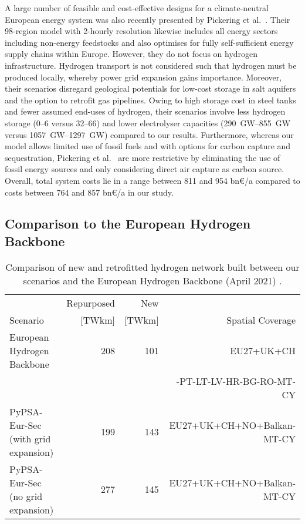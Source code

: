 A large number of feasible and cost-effective designs for a climate-neutral
European energy system was also recently presented by Pickering et
al.~\cite{pickeringDiversityOptions}. Their 98-region model with 2-hourly
resolution likewise includes all energy sectors including non-energy feedstocks
and also optimises for fully self-sufficient energy supply chains within Europe.
However, they do not focus on hydrogen infrastructure. Hydrogen transport is not
considered such that hydrogen must be produced locally, whereby power grid
expansion gains importance. Moreover, their scenarios disregard geological
potentials for low-cost storage in salt aquifers and the option to retrofit gas
pipelines. Owing to high storage cost in steel tanks and fewer assumed end-uses
of hydrogen, their scenarios involve less hydrogen storage (\SIrange{0}{6}{\twh}
versus \SIrange{32}{66}{\twh}) and lower electrolyser capacities
(\SIrange{290}{855}{\giga\watt} versus \SIrange{1057}{1297}{\giga\watt})
compared to our results. Furthermore, whereas our model allows limited use of
fossil fuels and with options for carbon capture and sequestration, Pickering et
al.~\cite{pickeringDiversityOptions} are more restrictive by eliminating the use
of fossil energy sources and only considering direct air capture as carbon
source. Overall, total system costs lie in a range between 811 and 954 bn\euro/a
compared to costs between 764 and 857 bn\euro/a in our study.

\subsection*{Comparison to the European Hydrogen Backbone}

\begin{table}
  \caption{Comparison of new and retrofitted hydrogen network built between our scenarios and the European Hydrogen Backbone (April 2021) \cite{gasforclimateExtendingEuropean2021}.}
  \label{tab:ehb}
  \centering
  \footnotesize
  \begin{tabular}{lrrr}
      \toprule
       & Repurposed & New &  \\
       Scenario& [TWkm] & [TWkm] & Spatial Coverage \\
      \midrule
      European Hydrogen Backbone \cite{gasforclimateExtendingEuropean2021} & 208 & 101 & EU27+UK+CH\\
      && & -PT-LT-LV-HR-BG-RO-MT-CY\\
      PyPSA-Eur-Sec (with grid expansion) & 199 & 143 & EU27+UK+CH+NO+Balkan-MT-CY \\
      PyPSA-Eur-Sec (no grid expansion) & 277 & 145 & EU27+UK+CH+NO+Balkan-MT-CY \\
      \bottomrule
    \end{tabular}
\end{table}

